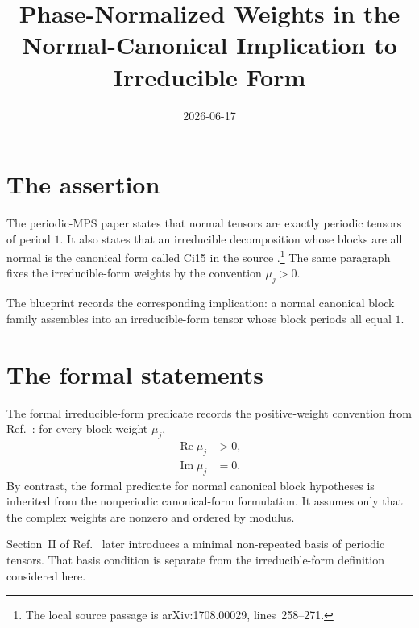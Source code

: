 \documentclass[11pt]{article}
\title{Phase-Normalized Weights in the Normal-Canonical Implication to Irreducible Form}
\author{}
\date{2026-06-17}
\begin{document}
\maketitle
{}

\section{The assertion}

The periodic-MPS paper states that normal tensors are exactly periodic tensors
of period $1$. It also states that an irreducible decomposition whose blocks
are all normal is the canonical form called Ci15 in the source
\cite[Section~II]{DeLasCuevas2017Irreducible}.\footnote{The local source
passage is arXiv:1708.00029, lines~258--271.}
The same paragraph fixes the irreducible-form weights by the convention
$\mu_j>0$.

The blueprint records the corresponding implication: a normal canonical block
family assembles into an irreducible-form tensor whose block periods all equal
$1$.

\section{The formal statements}

The formal irreducible-form predicate records the positive-weight convention
from Ref.~\cite{DeLasCuevas2017Irreducible}: for every block weight $\mu_j$,
\begin{align}
    \operatorname{Re}\mu_j
        &> 0,
    \label{eq:dccsp17_normal_canonical_irreducible_form_weights_positive_real_part}\\
    \operatorname{Im}\mu_j
        &= 0.
    \label{eq:dccsp17_normal_canonical_irreducible_form_weights_zero_imaginary_part}
\end{align}
By contrast, the formal predicate for normal canonical block hypotheses is
inherited from the nonperiodic canonical-form formulation. It assumes only
that the complex weights are nonzero and ordered by modulus.

Section~II of Ref.~\cite{DeLasCuevas2017Irreducible} later introduces a
minimal non-repeated basis of periodic tensors. That basis condition is
separate from the irreducible-form definition considered here.
\end{document}
